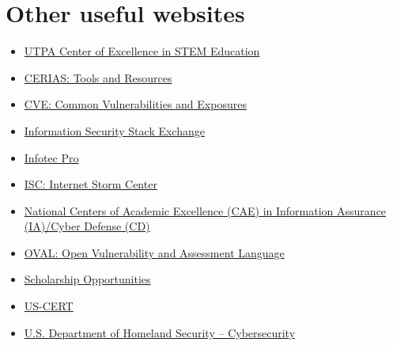 \documentclass[a4paper, 12pt, titlepage]{report}
\begin{document}
\section{Other useful websites}
\begin{multicols}{2}
\begin{itemize}
\item \href{https://www.utrgv.edu/utpa\_main/daa\_home/coecs\_home/cstem}{UTPA Center of Excellence in STEM Education}
\item \href{https://www.cerias.purdue.edu/site/tools\_and\_resources/}{CERIAS: Tools and Resources}
\item \href{https://cve.mitre.org/index.html}{CVE: Common Vulnerabilities and Exposures}
\item \href{https://security.stackexchange.com/}{Information Security Stack Exchange}
\item \href{http://www.infotectraining.com/}{Infotec Pro}
\item \href{https://isc.sans.edu/}{ISC: Internet Storm Center}
\item \href{https://www.nsa.gov/resources/students-educators/centers-academic-excellence/}{National Centers of Academic Excellence (CAE) in Information Assurance (IA)/Cyber Defense (CD)}
\item \href{https://oval.mitre.org/}{OVAL: Open Vulnerability and Assessment Language}
\item \href{https://niccs.us-cert.gov/}{Scholarship Opportunities}
\item \href{https://www.us-cert.gov/}{US-CERT}
\item \href{https://www.dhs.gov/topic/cybersecurity}{U.S. Department of Homeland Security – Cybersecurity}
\end{itemize}
\end{multicols}
\end{document}
